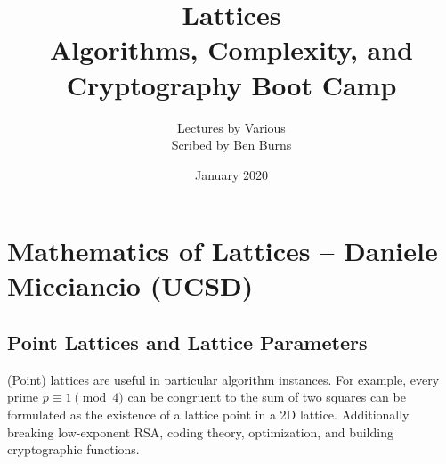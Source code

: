\documentclass[twoside, 10pt]{article}
\title{Lattices\\Algorithms, Complexity, and Cryptography Boot Camp}
\author{Lectures by Various \\ Scribed by Ben Burns}
\affil{Simmons Institute -- UC Berkeley}
\date{January 2020}
\begin{document}
\maketitle\thispagestyle{firstpage}

\tableofcontents

\section{Mathematics of Lattices -- Daniele Micciancio (UCSD)}

\subsection{Point Lattices and Lattice Parameters}

(Point) lattices are useful in particular algorithm instances. For example, every prime $p \equiv 1 \pmod{4}$ can be congruent to the sum of two squares can be formulated as the existence of a lattice point in a 2D lattice. Additionally breaking low-exponent RSA, coding theory, optimization, and building cryptographic functions. 
\end{document}
